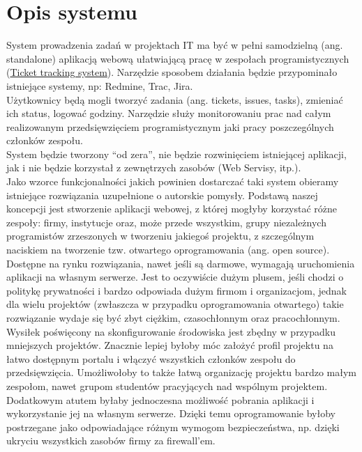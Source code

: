 \documentclass[a4paper,12pt,notitlepage]{mwrep}
\begin{document}
\section{Opis systemu}
System prowadzenia zadań w projektach IT ma być w pełni samodzielną (ang. standalone)
aplikacją webową ułatwiającą pracę w zespołach programistycznych (\href{http://en.wikipedia.org/wiki/Issue_tracking_system}{Ticket tracking system}).
Narzędzie sposobem działania będzie przypominało istniejące systemy, np: Redmine, Trac, Jira.\\
Użytkownicy będą mogli tworzyć zadania (ang. tickets, issues, tasks), zmieniać ich status, logować godziny.
Narzędzie służy monitorowaniu prac nad całym realizowanym przedsięwzięciem programistycznym jaki pracy poszczególnych członków zespołu.\\
System będzie tworzony “od zera”, nie będzie rozwinięciem istniejącej aplikacji,
jak i nie będzie korzystał z zewnętrzych zasobów (Web Servisy, itp.).\\	
Jako wzorce funkcjonalności jakich powinien dostarczać taki system obieramy
istniejące rozwiązania uzupełnione o autorskie pomysły.
Podstawą naszej koncepcji jest stworzenie aplikacji webowej, z której mogłyby korzystać różne zespoły:
firmy, instytucje oraz, może przede wszystkim, grupy niezależnych programistów zrzeszonych
w tworzeniu jakiegoś projektu, z szczególnym naciskiem na tworzenie tzw. otwartego oprogramowania
(ang. open source). Dostępne na rynku rozwiązania, nawet jeśli są darmowe, wymagają uruchomienia
aplikacji na własnym serwerze. Jest to oczywiście dużym plusem, jeśli chodzi o politykę prywatności
i bardzo odpowiada dużym firmom i organizacjom, jednak dla wielu projektów
(zwłaszcza w przypadku oprogramowania otwartego) takie rozwiązanie wydaje się być zbyt ciężkim,
czasochłonnym oraz pracochłonnym. Wysiłek poświęcony na skonfigurowanie środowiska jest zbędny
w przypadku mniejszych projektów. Znacznie lepiej byłoby móc założyć profil projektu na łatwo
dostępnym portalu i włączyć wszystkich członków zespołu do przedsięwzięcia. Umożliwołoby to także
łatwą organizację projektu bardzo małym zespołom, nawet grupom studentów pracyjących nad wspólnym projektem.\\
Dodatkowym atutem byłaby jednoczesna możliwość pobrania aplikacji i wykorzystanie jej na własnym serwerze.
Dzięki temu oprogramowanie byłoby postrzegane jako odpowiadające różnym wymogom bezpieczeństwa,
np. dzięki ukryciu wszystkich zasobów firmy za firewall’em.
\end{document}
